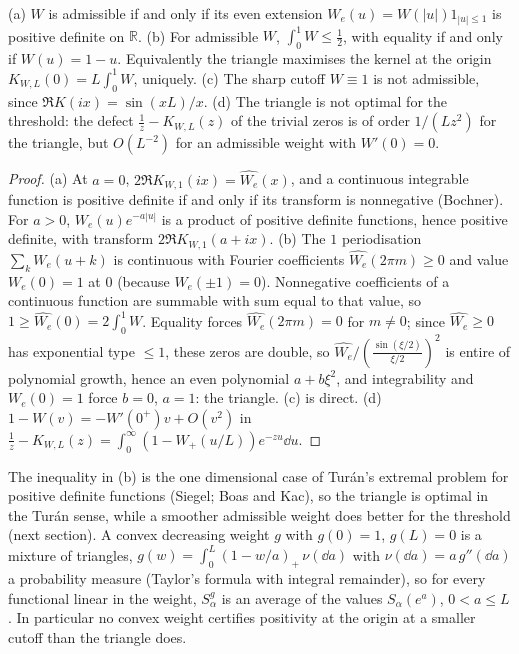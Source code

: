 \begin{proposition}\label{bo:prop:triangle}
(a) $W$ is admissible if and only if its even extension $W_e(u)=W(|u|)1_{|u|\le1}$ is positive definite on $\mathbb R$. (b) For admissible $W$, $\int_0^1W\le\frac12$, with equality if and only if $W(u)=1-u$. Equivalently the triangle maximises the kernel at the origin $K_{W,L}(0)=L\int_0^1W$, uniquely. (c) The sharp cutoff $W\equiv1$ is not admissible, since $\Re K(ix)=\sin(xL)/x$. (d) The triangle is not optimal for the threshold: the defect $\frac1z-K_{W,L}(z)$ of the trivial zeros is of order $1/(Lz^2)$ for the triangle, but $O(L^{-2})$ for an admissible weight with $W'(0)=0$.
\end{proposition}

\begin{proof}
(a) At $a=0$, $2\Re K_{W,1}(ix)=\widehat{W_e}(x)$, and a continuous integrable function is positive definite if and only if its transform is nonnegative (Bochner). For $a>0$, $W_e(u)e^{-a|u|}$ is a product of positive definite functions, hence positive definite, with transform $2\Re K_{W,1}(a+ix)$. (b) The $1$ periodisation $\sum_kW_e(u+k)$ is continuous with Fourier coefficients $\widehat{W_e}(2\pi m)\ge0$ and value $W_e(0)=1$ at $0$ (because $W_e(\pm1)=0$). Nonnegative coefficients of a continuous function are summable with sum equal to that value, so $1\ge\widehat{W_e}(0)=2\int_0^1W$. Equality forces $\widehat{W_e}(2\pi m)=0$ for $m\ne0$; since $\widehat{W_e}\ge0$ has exponential type $\le1$, these zeros are double, so $\widehat{W_e}/(\frac{\sin(\xi/2)}{\xi/2})^2$ is entire of polynomial growth, hence an even polynomial $a+b\xi^2$, and integrability and $W_e(0)=1$ force $b=0$, $a=1$: the triangle. (c) is direct. (d) $1-W(v)=-W'(0^+)v+O(v^2)$ in $\frac1z-K_{W,L}(z)=\int_0^\infty(1-W_+(u/L))e^{-zu}\dd u$.
\end{proof}

The inequality in (b) is the one dimensional case of Tur\'an's extremal problem for positive definite functions (Siegel; Boas and Kac), so the triangle is optimal in the Tur\'an sense, while a smoother admissible weight does better for the threshold (next section). A convex decreasing weight $g$ with $g(0)=1$, $g(L)=0$ is a mixture of triangles, $g(w)=\int_0^L(1-w/a)_+\,\nu(\dd a)$ with $\nu(\dd a)=a\,g''(\dd a)$ a probability measure (Taylor's formula with integral remainder), so for every functional linear in the weight, $S^g_\alpha$ is an average of the values $S_\alpha(e^a)$, $0<a\le L$. In particular no convex weight certifies positivity at the origin at a smaller cutoff than the triangle does. %

